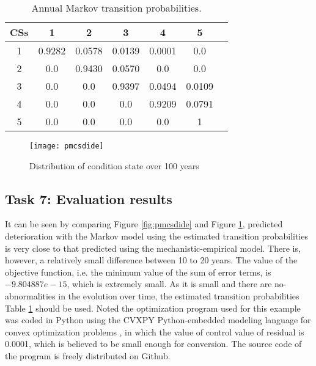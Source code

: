 \documentclass[Journal]{ascelike}
\begin{document}
\begin{table}[H]
\centering \caption{{\footnotesize{}Annual Markov transition probabilities.}}
\label{resultmtp}
{\footnotesize{} }%
\begin{tabular}{c|cccccc}
\hline 
{\footnotesize{}CSs } & {\footnotesize{}1 } & {\footnotesize{}2 } & {\footnotesize{}3 } & {\footnotesize{}4 } & {\footnotesize{}5 } & \tabularnewline
\hline 
{\footnotesize{}1 } & {\footnotesize{}0.9282 } & {\footnotesize{}0.0578 } & {\footnotesize{}0.0139 } & {\footnotesize{}0.0001 } & {\footnotesize{}0.0 } & \tabularnewline
{\footnotesize{}2 } & {\footnotesize{}0.0 } & {\footnotesize{}0.9430} & {\footnotesize{}0.0570 } & {\footnotesize{}0.0 } & {\footnotesize{}0.0 } & \tabularnewline
{\footnotesize{}3 } & {\footnotesize{}0.0 } & {\footnotesize{}0.0 } & {\footnotesize{}0.9397 } & {\footnotesize{}0.0494 } & {\footnotesize{}0.0109 } & \tabularnewline
{\footnotesize{}4 } & {\footnotesize{}0.0 } & {\footnotesize{}0.0 } & {\footnotesize{}0.0 } & {\footnotesize{}0.9209 } & {\footnotesize{}0.0791 } & \tabularnewline
{\footnotesize{}5 } & {\footnotesize{}0.0 } & {\footnotesize{}0.0 } & {\footnotesize{}0.0 } & {\footnotesize{}0.0 } & {\footnotesize{}1 } & \tabularnewline
\hline 
\end{tabular}
\end{table}

\begin{figure}[h!]
\centering \texttt{[image: pmcsdide]} \caption{Distribution of condition state over 100 years}
\label{fig:pmcsdide-1} 
\end{figure}

\subsection{Task 7: Evaluation results}

It can be seen by comparing Figure \ref{fig:pmcsdide} and Figure
\ref{fig:pmcsdide-1}, predicted deterioration with the Markov model
using the estimated transition probabilities is very close to that
predicted using the mechanistic-empirical model. There is, however,
a relatively small difference between 10 to 20 years. The value of
the objective function, i.e. the minimum value of the sum of error
terms, is $-9.804887e-15$, which is extremely small. As it is small
and there are no-abnormalities in the evolution over time, the estimated
transition probabilities Table \ref{resultmtp} should be used. Noted
the optimization program used for this example was coded in Python
using the CVXPY Python-embedded modeling language for convex optimization
problems , in which the value of control value of
residual is 0.0001, which is believed to be small enough for conversion.
The source code of the program is freely distributed on Github.
\end{document}
